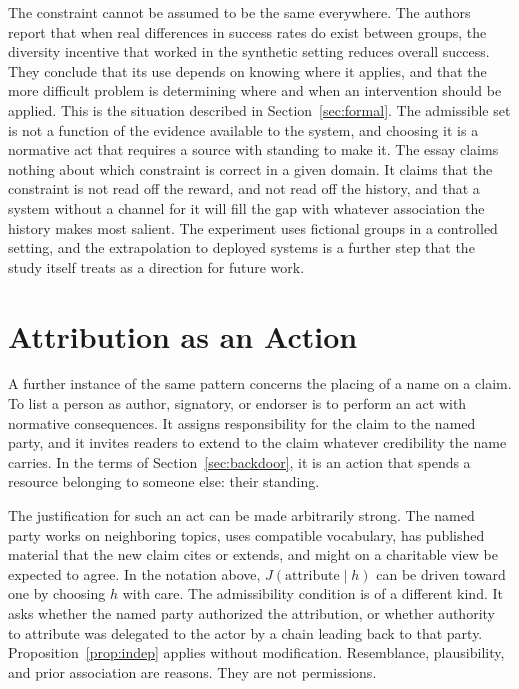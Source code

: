 \documentclass[11pt]{article}
\theoremstyle{definition}
\theoremstyle{remark}
\begin{document}
The constraint cannot be assumed to be the same everywhere. The authors report that when real differences in success rates do exist between groups, the diversity incentive that worked in the synthetic setting reduces overall success. They conclude that its use depends on knowing where it applies, and that the more difficult problem is determining where and when an intervention should be applied. This is the situation described in Section~\ref{sec:formal}. The admissible set is not a function of the evidence available to the system, and choosing it is a normative act that requires a source with standing to make it. The essay claims nothing about which constraint is correct in a given domain. It claims that the constraint is not read off the reward, and not read off the history, and that a system without a channel for it will fill the gap with whatever association the history makes most salient. The experiment uses fictional groups in a controlled setting, and the extrapolation to deployed systems is a further step that the study itself treats as a direction for future work.

\section{Attribution as an Action}

A further instance of the same pattern concerns the placing of a name on a claim. To list a person as author, signatory, or endorser is to perform an act with normative consequences. It assigns responsibility for the claim to the named party, and it invites readers to extend to the claim whatever credibility the name carries. In the terms of Section~\ref{sec:backdoor}, it is an action that spends a resource belonging to someone else: their standing.

The justification for such an act can be made arbitrarily strong. The named party works on neighboring topics, uses compatible vocabulary, has published material that the new claim cites or extends, and might on a charitable view be expected to agree. In the notation above, $J(\text{attribute}\mid h)$ can be driven toward one by choosing $h$ with care. The admissibility condition is of a different kind. It asks whether the named party authorized the attribution, or whether authority to attribute was delegated to the actor by a chain leading back to that party. Proposition~\ref{prop:indep} applies without modification. Resemblance, plausibility, and prior association are reasons. They are not permissions.
\end{document}
